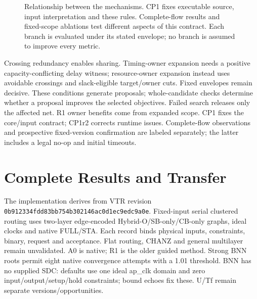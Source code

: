 \documentclass[conference,10pt]{IEEEtran}
\begin{document}
\begin{figure}[t]
\centering\footnotesize
{}
\caption{Relationship between the mechanisms. CP1 fixes executable source, input interpretation and these rules. Complete-flow results and fixed-scope ablations test different aspects of this contract. Each branch is evaluated under its stated envelope; no branch is assumed to improve every metric.}
\label{fig:method}
\end{figure}

Crossing redundancy enables sharing. Timing-owner expansion needs a positive capacity-conflicting delay witness; resource-owner expansion instead uses avoidable crossings and slack-eligible target/owner cuts. Fixed envelopes remain decisive. These conditions generate proposals; whole-candidate checks determine whether a proposal improves the selected objectives. Failed search releases only the affected net. R1 owner benefits come from expanded scope. CP1 fixes the core/input contract; CP1r2 corrects runtime issues. Complete-flow observations and prospective fixed-version confirmation are labeled separately; the latter includes a legal no-op and initial timeouts.
\section{Complete Results and Transfer}
The implementation derives from VTR revision \texttt{0b912334fdd83bb754b302146ac0d1ec9edc9a0e}. Fixed-input serial clustered routing uses two-layer edge-encoded Hybrid-O/SB-only/CB-only graphs, ideal clocks and native FULL/STA. Each record binds physical inputs, constraints, binary, request and acceptance. Flat routing, CHANZ and general multilayer remain unvalidated. A0 is native; R1 is the older guided method. Strong BNN roots permit eight native convergence attempts with a 1.01 threshold. BNN has no supplied SDC: defaults use one ideal ap\_clk domain and zero input/output/setup/hold constraints; bound echoes fix these. U/Tf remain separate versions/opportunities.
\end{document}
